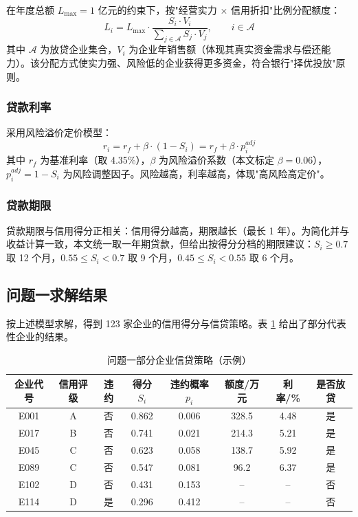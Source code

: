\documentclass[12pt]{ctexart}
\begin{document}
在年度总额 $L_{\max}=1$ 亿元的约束下，按"经营实力 $\times$ 信用折扣"比例分配额度：
\begin{equation}
L_i = L_{\max}\cdot\frac{S_i\cdot V_i}{\sum_{j\in\mathcal{A}} S_j\cdot V_j},\qquad i\in\mathcal{A}
\label{eq:quota}
\end{equation}
其中 $\mathcal{A}$ 为放贷企业集合，$V_i$ 为企业年销售额（体现其真实资金需求与偿还能力）。该分配方式使实力强、风险低的企业获得更多资金，符合银行"择优投放"原则。

\subsubsection{贷款利率}

采用风险溢价定价模型：
\begin{equation}
r_i = r_f + \beta\cdot (1-S_i) = r_f + \beta\cdot p_i^{adj}
\label{eq:rate}
\end{equation}
其中 $r_f$ 为基准利率（取 4.35\%），$\beta$ 为风险溢价系数（本文标定 $\beta=0.06$），$p_i^{adj}=1-S_i$ 为风险调整因子。风险越高，利率越高，体现"高风险高定价"。

\subsubsection{贷款期限}

贷款期限与信用得分正相关：信用得分越高，期限越长（最长 1 年）。为简化并与收益计算一致，本文统一取一年期贷款，但给出按得分分档的期限建议：$S_i\geq 0.7$ 取 12 个月，$0.55\leq S_i<0.7$ 取 9 个月，$0.45\leq S_i<0.55$ 取 6 个月。

\subsection{问题一求解结果}

按上述模型求解，得到 123 家企业的信用得分与信贷策略。表 \ref{tab:q1} 给出了部分代表性企业的结果。

\begin{table}[H]
\centering
\caption{问题一部分企业信贷策略（示例）}
\label{tab:q1}
\small
\begin{tabular}{cccccccc}
\toprule
\textbf{企业代号} & \textbf{信用评级} & \textbf{违约} & \textbf{得分} $S_i$ & \textbf{违约概率} $p_i$ & \textbf{额度/万元} & \textbf{利率/\%} & \textbf{是否放贷} \\
\midrule
E001 & A & 否 & 0.862 & 0.006 & 328.5 & 4.48 & 是 \\
E017 & B & 否 & 0.741 & 0.021 & 214.3 & 5.21 & 是 \\
E045 & C & 否 & 0.623 & 0.058 & 138.7 & 5.92 & 是 \\
E089 & C & 否 & 0.547 & 0.081 & 96.2 & 6.37 & 是 \\
E102 & D & 否 & 0.431 & 0.153 & -- & -- & 否 \\
E114 & D & 是 & 0.296 & 0.412 & -- & -- & 否 \\
\bottomrule
\end{tabular}
\end{table}
\end{document}

